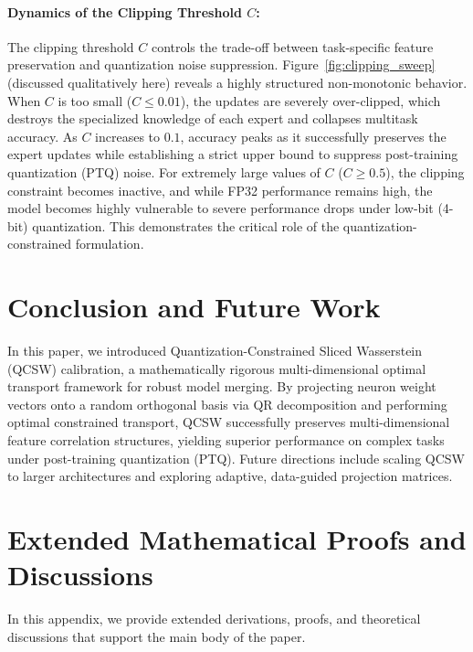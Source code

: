 \documentclass{article}
\theoremstyle{plain}
\theoremstyle{definition}
\theoremstyle{remark}
\begin{document}
\paragraph{Dynamics of the Clipping Threshold $C$:}
The clipping threshold $C$ controls the trade-off between task-specific feature preservation and quantization noise suppression. Figure~\ref{fig:clipping_sweep} (discussed qualitatively here) reveals a highly structured non-monotonic behavior. When $C$ is too small ($C \le 0.01$), the updates are severely over-clipped, which destroys the specialized knowledge of each expert and collapses multitask accuracy. As $C$ increases to $0.1$, accuracy peaks as it successfully preserves the expert updates while establishing a strict upper bound to suppress post-training quantization (PTQ) noise. For extremely large values of $C$ ($C \ge 0.5$), the clipping constraint becomes inactive, and while FP32 performance remains high, the model becomes highly vulnerable to severe performance drops under low-bit (4-bit) quantization. This demonstrates the critical role of the quantization-constrained formulation.

\section{Conclusion and Future Work}
\label{sec:conclusion}

In this paper, we introduced Quantization-Constrained Sliced Wasserstein (QCSW) calibration, a mathematically rigorous multi-dimensional optimal transport framework for robust model merging. By projecting neuron weight vectors onto a random orthogonal basis via QR decomposition and performing optimal constrained transport, QCSW successfully preserves multi-dimensional feature correlation structures, yielding superior performance on complex tasks under post-training quantization (PTQ). Future directions include scaling QCSW to larger architectures and exploring adaptive, data-guided projection matrices.




\newpage
\appendix
\onecolumn
\section{Extended Mathematical Proofs and Discussions}
\label{sec:appendix}

In this appendix, we provide extended derivations, proofs, and theoretical discussions that support the main body of the paper.
\end{document}
